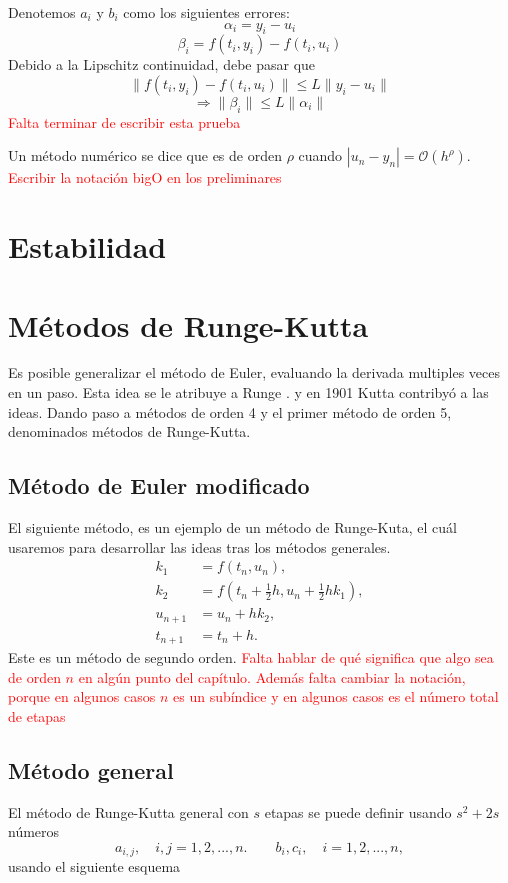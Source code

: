 Denotemos $a_i$ y $b_i$ como los siguientes errores:
\begin{equation}
    \alpha_i = y_i - u_i
\end{equation}
\begin{equation}
    \beta_i = f(t_i, y_i) - f(t_i, u_i)
\end{equation}
Debido a la Lipschitz continuidad, debe pasar que
$$\|f(t_i, y_i) - f(t_i, u_i)\| \leq L \| y_i - u_i\|$$
$$\Rightarrow \|\beta_i\| \leq L \|\alpha_i\|$$
\textcolor{red}{Falta terminar de escribir esta prueba}
\begin{definition}
    Un método numérico se dice que es de orden $\rho$ cuando $|u_n - y_n| = \mathcal{O}(h^\rho)$. \textcolor{red}{Escribir la notación bigO en los preliminares}
\end{definition}
\section{Estabilidad}

\section{Métodos de Runge-Kutta}
Es posible generalizar el método de Euler, evaluando la derivada multiples veces en un paso. Esta idea se le atribuye a Runge \cite{book:110336}. y en 1901 Kutta contribyó a las ideas. Dando paso a métodos de orden 4 y el primer método de orden 5, denominados métodos de Runge-Kutta.
\subsection{Método de Euler modificado}
El siguiente método, es un ejemplo de un método de Runge-Kuta, el cuál usaremos para desarrollar las ideas tras los métodos generales.
\begin{align*}
    k_1 &= f(t_n, u_n),\\
    k_2 &= f(t_n + \tfrac{1}{2}h,u_n + \tfrac{1}{2}hk_1),\\
    u_{n+1} &= u_n + hk_2,\\
    t_{n+1} &= t_{n}+h.
\end{align*}
Este es un método de segundo orden. 
\textcolor{red}{Falta hablar de qué significa que algo sea de orden $n$ en algún punto del capítulo. Además falta cambiar la notación, porque en algunos casos $n$ es un subíndice y en algunos casos es el número total de etapas}
\subsection{Método general}
El método de Runge-Kutta general con $s$ etapas se puede definir usando $s^2 + 2s$ números
\begin{equation}
    a_{i,j}, \quad i,j = 1,2,..., n. \qquad b_i, c_i, \quad i= 1, 2, ..., n,
\end{equation}
usando el siguiente esquema

